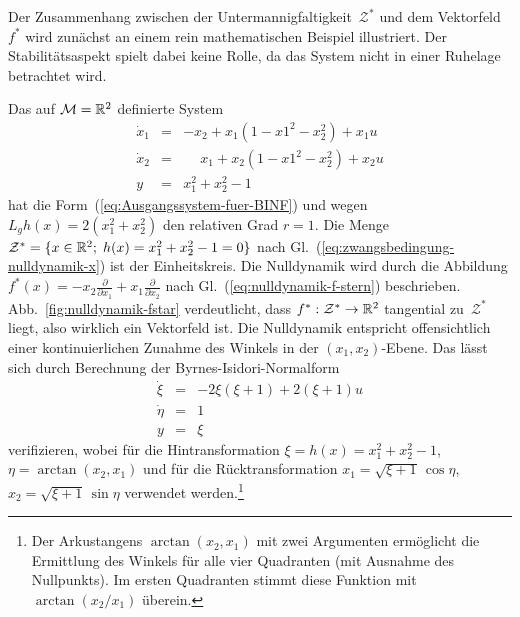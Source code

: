 Der Zusammenhang zwischen der Untermannigfaltigkeit~$\mathcal{Z}^{*}$
und dem Vektorfeld~$f^{*}$ wird zunächst an einem rein mathematischen
Beispiel illustriert. Der Stabilitätsaspekt spielt dabei keine Rolle,
da das System nicht in einer Ruhelage betrachtet wird.
\begin{example}
\label{exa:nulldynamik-fstar}Das auf $\mathcal{M}={\mathbb{R}}^{2}$ definierte
System
\[
\begin{array}{lcl}
\dot{x}_{1} & = & -x_{2}+x_{1}(1-x1^{2}-x_{2}^{2})+x_{1}u\\
\dot{x}_{2} & = & \phantom{-}x_{1}+x_{2}(1-x1^{2}-x_{2}^{2})+x_{2}u\\
y & = & x_{1}^{2}+x_{2}^{2}-1
\end{array}
\]
hat die Form~(\ref{eq:Ausgangssystem-fuer-BINF}) und wegen $L_{g}h(x)=2(x_{1}^{2}+x_{2}^{2})$
den relativen Grad $r=1$. Die Menge $\mathcal{Z}^{*}=\{x\in{\mathbb{R}}^{2};\;h(x)=x_{1}^{2}+x_{2}^{2}-1=0\}$
nach Gl.~(\ref{eq:zwangsbedingung-nulldynamik-x}) ist der Einheitskreis.
Die Nulldynamik wird durch die Abbildung $f^{*}(x)=-x_{2}\tfrac{\partial}{\partial x_{1}}+x_{1}\tfrac{\partial}{\partial x_{2}}$
nach Gl.~(\ref{eq:nulldynamik-f-stern}) beschrieben. Abb.~\ref{fig:nulldynamik-fstar}
verdeutlicht, dass $f^{*}:\mathcal{Z}^{*}\to{\mathbb{R}}^{2}$ tangential zu~$\mathcal{Z}^{*}$
liegt, also wirklich ein Vektorfeld ist. Die Nulldynamik entspricht
offensichtlich einer kontinuierlichen Zunahme des Winkels in der $(x_{1},x_{2})$-Ebene.
Das lässt sich durch Berechnung der Byrnes-Isidori-Normalform
\[
\begin{array}{lcl}
\dot{\xi} & = & -2\xi(\xi+1)+2(\xi+1)u\\
\dot{\eta} & = & 1\\
y & = & \xi
\end{array}
\]
verifizieren, wobei für die Hintransformation $\xi=h(x)=x_{1}^{2}+x_{2}^{2}-1$,
$\eta=\arctan(x_{2},x_{1})$ und für die Rücktransformation $x_{1}=\sqrt{\xi+1}\,\cos\eta$,
$x_{2}=\sqrt{\xi+1}\,\sin\eta$ verwendet werden.\footnote{Der Arkustangens $\arctan(x_{2},x_{1})$ mit zwei Argumenten ermöglicht
die Ermittlung des Winkels für alle vier Quadranten (mit Ausnahme
des Nullpunkts). Im ersten Quadranten stimmt diese Funktion mit $\arctan(x_{2}/x_{1})$
überein.}
\end{example}
